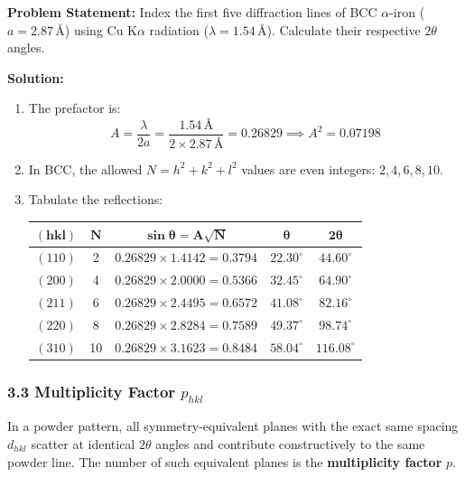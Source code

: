 \documentclass[11pt,a4paper]{article}
\begin{document}
\begin{solbox}
\textbf{Problem Statement:} Index the first five diffraction lines of BCC $\alpha$-iron ($a = 2.87\,\text{\AA}$) using $\text{Cu K}\alpha$ radiation ($\lambda = 1.54\,\text{\AA}$). Calculate their respective $2\theta$ angles.

\textbf{Solution:}
\begin{enumerate}
    \item The prefactor is:
    \begin{equation}
    A = \frac{\lambda}{2a} = \frac{1.54\,\text{\AA}}{2 \times 2.87\,\text{\AA}} = 0.26829 \implies A^2 = 0.07198
    \end{equation}
    \item In BCC, the allowed $N = h^2 + k^2 + l^2$ values are even integers: $2, 4, 6, 8, 10$.
    \item Tabulate the reflections:
    \begin{center}
    \begin{tabular}{ccccc}
    \toprule
    $\mathbf{(hkl)}$ & $\mathbf{N}$ & $\mathbf{\sin\theta = A\sqrt{N}}$ & $\mathbf{\theta}$ & $\mathbf{2\theta}$ \\
    \midrule
    $(110)$ & 2 & $0.26829 \times 1.4142 = 0.3794$ & $22.30^\circ$ & $\mathbf{44.60^\circ}$ \\
    $(200)$ & 4 & $0.26829 \times 2.0000 = 0.5366$ & $32.45^\circ$ & $\mathbf{64.90^\circ}$ \\
    $(211)$ & 6 & $0.26829 \times 2.4495 = 0.6572$ & $41.08^\circ$ & $\mathbf{82.16^\circ}$ \\
    $(220)$ & 8 & $0.26829 \times 2.8284 = 0.7589$ & $49.37^\circ$ & $\mathbf{98.74^\circ}$ \\
    $(310)$ & 10 & $0.26829 \times 3.1623 = 0.8484$ & $58.04^\circ$ & $\mathbf{116.08^\circ}$ \\
    \bottomrule
    \end{tabular}
    \end{center}
\end{enumerate}
\end{solbox}

\subsubsection{3.3 Multiplicity Factor \texorpdfstring{$p_{hkl}$}{p\_hkl}}
In a powder pattern, all symmetry-equivalent planes with the exact same spacing $d_{hkl}$ scatter at identical $2\theta$ angles and contribute constructively to the same powder line. The number of such equivalent planes is the \textbf{multiplicity factor} $p$.
\end{document}
